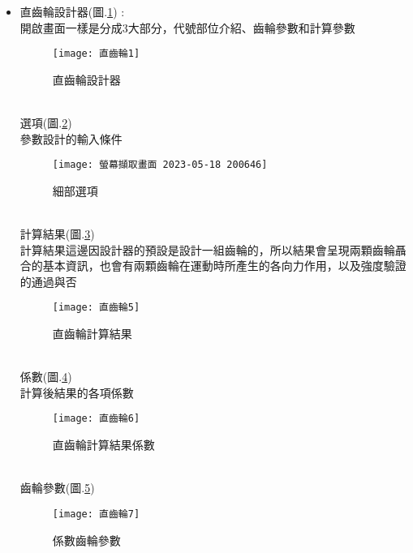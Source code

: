 \begin{itemize}
\newpage
	
	\item 直齒輪設計器(圖.\ref{2.18}) :\\
	
		\qquad 開啟畫面一樣是分成3大部分，代號部位介紹、齒輪參數和計算參數
		\begin{figure}[hbt!]
		\begin{center}
		\texttt{[image: 直齒輪1]}
		\caption{\Large 直齒輪設計器}\label{2.18}
		\end{center}
		\end{figure}
		\\
		選項(圖.\ref{2.19})\\
		參數設計的輸入條件\\
		\begin{figure}[hbt!]
		\begin{center}
		\texttt{[image: 螢幕擷取畫面 2023-05-18 200646]}
		\caption{\Large 細部選項}\label{2.19}
		\end{center}
		\end{figure}
		\\
		計算結果(圖.\ref{2.20})\\
		\qquad 計算結果這邊因設計器的預設是設計一組齒輪的，所以結果會呈現兩顆齒輪聶合的基本資訊，也會有兩顆齒輪在運動時所產生的各向力作用，以及強度驗證的通過與否\\
		\begin{figure}[hbt!]
		\begin{center}
		\texttt{[image: 直齒輪5]}
		\caption{\Large 直齒輪計算結果}\label{2.20}
		\end{center}
		\end{figure}
		\\
		係數(圖.\ref{2.21})\\
		計算後結果的各項係數\\
		\begin{figure}[hbt!]
		\begin{center}
		\texttt{[image: 直齒輪6]}
		\caption{\Large 直齒輪計算結果係數}\label{2.21}
		\end{center}
		\end{figure}
		\\
		齒輪參數(圖.\ref{2.22})\\
		\begin{figure}[hbt!]
		\begin{center}
		\texttt{[image: 直齒輪7]}
		\caption{\Large 係數齒輪參數}\label{2.22}
		\end{center}
		\end{figure}

\end{itemize}
